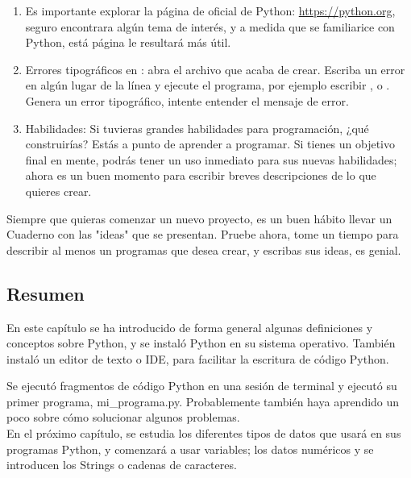 \begin{enumerate}[2.3.1]
	\item Es importante explorar la página de oficial de Python:  \href{https://python.org}{\color{vino}https://python.org}, seguro encontrara algún tema de interés, y a medida que se familiarice con Python, está  página le resultará más útil.
	
	\item Errores tipográficos en {}: abra el archivo  {} que acaba de crear. Escriba un error en algún 	lugar de la línea y ejecute el programa, por ejemplo escribir {}, o   {}. 	Genera un error tipográfico,  intente entender el mensaje de error. 
	
	
	\item Habilidades: Si tuvieras grandes habilidades para programación, ¿qué construirías?
	Estás a punto de aprender a programar. Si tienes un objetivo final en mente, podrás
	tener un uso inmediato para sus nuevas habilidades; ahora es un buen momento para escribir breves
	descripciones de lo que quieres crear. 
\end{enumerate}


Siempre que quieras comenzar un nuevo proyecto, es un buen hábito llevar un Cuaderno con las "{}ideas{}" que se presentan. Pruebe ahora,  tome un tiempo para describir al menos un programas que desea crear, y escribas sus ideas, es genial.






\subsection{Resumen}

En este capítulo se ha introducido de forma general algunas definiciones y conceptos sobre Python,  y se instaló
Python en su sistema operativo. También instaló un  editor de texto o IDE, para facilitar la escritura de código Python. 

Se ejecutó fragmentos de código Python en una sesión de terminal y ejecutó su primer programa, {\ttfamily mi\_programa.py}. 
Probablemente también haya aprendido un poco sobre cómo solucionar algunos problemas.\\


En el próximo capítulo, se estudia  los diferentes tipos de datos que usará en sus programas Python, y comenzará a usar variables; los datos numéricos y se introducen los Strings o cadenas de caracteres.



